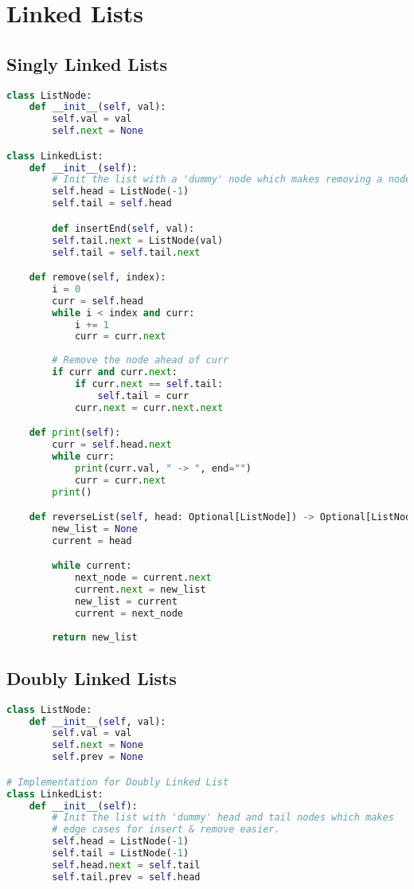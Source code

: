\documentclass[english, threecolumn]{latex4ei/latex4ei_sheet}
\begin{document}
\section{Linked Lists}
\begin{sectionbox}
\subsection{Singly Linked Lists}
\begin{lstlisting}[language=python, gobble=0]
class ListNode:
    def __init__(self, val):
        self.val = val
        self.next = None

class LinkedList:
    def __init__(self):
        # Init the list with a 'dummy' node which makes removing a node from the beginning of list easier.
        self.head = ListNode(-1)
        self.tail = self.head

		def insertEnd(self, val):
        self.tail.next = ListNode(val)
        self.tail = self.tail.next

    def remove(self, index):
        i = 0
        curr = self.head
        while i < index and curr:
            i += 1
            curr = curr.next
        
        # Remove the node ahead of curr
        if curr and curr.next:
            if curr.next == self.tail:
                self.tail = curr
            curr.next = curr.next.next

    def print(self):
        curr = self.head.next
        while curr:
            print(curr.val, " -> ", end="")
            curr = curr.next
        print()

    def reverseList(self, head: Optional[ListNode]) -> Optional[ListNode]:
        new_list = None
        current = head

        while current:
            next_node = current.next
            current.next = new_list
            new_list = current
            current = next_node
        
        return new_list
\end{lstlisting}
\end{sectionbox}

\begin{sectionbox}
\subsection{Doubly Linked Lists}
\begin{lstlisting}[language=python, gobble=0]
class ListNode:
    def __init__(self, val):
        self.val = val
        self.next = None
        self.prev = None

# Implementation for Doubly Linked List
class LinkedList:
    def __init__(self):
        # Init the list with 'dummy' head and tail nodes which makes 
        # edge cases for insert & remove easier.
        self.head = ListNode(-1)
        self.tail = ListNode(-1)
        self.head.next = self.tail
        self.tail.prev = self.head
\end{lstlisting}
\end{sectionbox}
\end{document}
